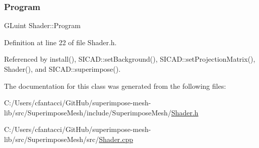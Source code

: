 \subsubsection{\texorpdfstring{Program}{Program}}
{\footnotesize\ttfamily G\+Luint Shader\+::\+Program}



Definition at line 22 of file Shader.\+h.



Referenced by install(), S\+I\+C\+A\+D\+::set\+Background(), S\+I\+C\+A\+D\+::set\+Projection\+Matrix(), Shader(), and S\+I\+C\+A\+D\+::superimpose().



The documentation for this class was generated from the following files\+:\begin{DoxyCompactItemize}
\item 
C\+:/\+Users/cfantacci/\+Git\+Hub/superimpose-\/mesh-\/lib/src/\+Superimpose\+Mesh/include/\+Superimpose\+Mesh/\mbox{\hyperlink{Shader_8h}{Shader.\+h}}\item 
C\+:/\+Users/cfantacci/\+Git\+Hub/superimpose-\/mesh-\/lib/src/\+Superimpose\+Mesh/src/\mbox{\hyperlink{Shader_8cpp}{Shader.\+cpp}}\end{DoxyCompactItemize}
